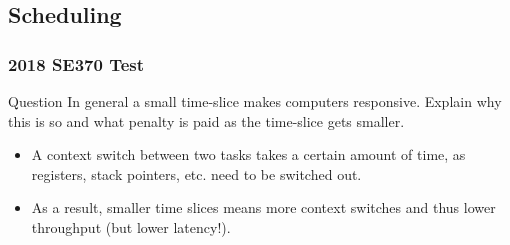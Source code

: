 \documentclass{beamer}
\begin{document}
\subsection{Scheduling}
\begin{frame}
  \frametitle{2018 SE370 Test}
  \begin{block}{Question}
    In general a small time-slice makes computers responsive. Explain why this is so and what penalty is paid as the time-slice gets smaller.
  \end{block}
  \pause
  \begin{itemize}
    \item A context switch between two tasks takes a certain amount of time, as registers, stack pointers, etc. need to be switched out.
    \item As a result, smaller time slices means more context switches and thus lower throughput (but lower latency!).
  \end{itemize}
\end{frame}
\end{document}
